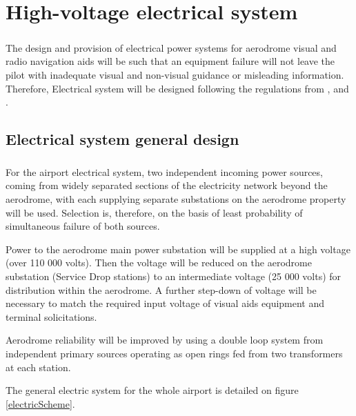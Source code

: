 \chapter{High-voltage electrical system}
\paragraph{} The design and provision of electrical power systems for aerodrome visual and radio navigation aids will be such that an equipment failure will not leave the pilot with inadequate visual and non-visual guidance or misleading information. Therefore, Electrical system will be designed following the regulations from \cite{ICAO2006}, \cite{Sanidad2009} and \cite{Standards2016}.

	\section{Electrical system general design}
	\paragraph{} For the airport electrical system, two independent incoming power sources, coming from widely separated sections of the electricity network beyond the aerodrome, with each supplying separate substations on the aerodrome property will be used. Selection is, therefore, on the basis of least probability of simultaneous failure of both sources. 
	
	Power to the aerodrome main power substation will be supplied at a high voltage (over 110 000 volts). Then the voltage will be reduced on the aerodrome substation (Service Drop stations) to an intermediate voltage (25 000 volts) for distribution within the aerodrome. A further step-down of voltage will be necessary to match the required input voltage of visual aids equipment and terminal solicitations.
	
	Aerodrome reliability will be improved by using a double loop system from independent primary sources operating as open rings fed from two transformers at each station.
	
	The general electric system for the whole airport is detailed on figure \ref{electricScheme}.
	
